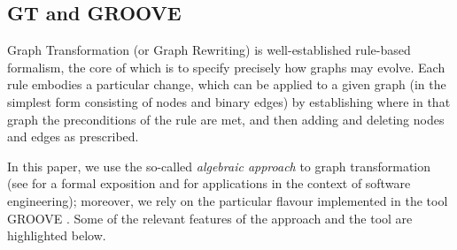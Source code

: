 
\subsection{GT and GROOVE}\label{sec:GTS}

Graph Transformation (or Graph Rewriting) is well-established rule-based formalism, the core of which is to specify precisely how graphs may evolve. Each rule embodies a particular change, which can be applied to a given graph (in the simplest form consisting of nodes and binary edges) by establishing where in that graph the preconditions of the rule are met, and then adding and deleting nodes and edges as prescribed.

In this paper, we use the so-called \emph{algebraic approach} to graph transformation (see \cite{DBLP:series/eatcs/EhrigEPT06} for a formal exposition and \cite{DBLP:books/sp/HeckelT20} for applications in the context of software engineering); moreover, we rely on the particular flavour implemented in the tool GROOVE \cite{DBLP:journals/sttt/GhamarianMRZZ12,GROOVE}. Some of the relevant features of the approach and the tool are highlighted below.
%
%
%
%
